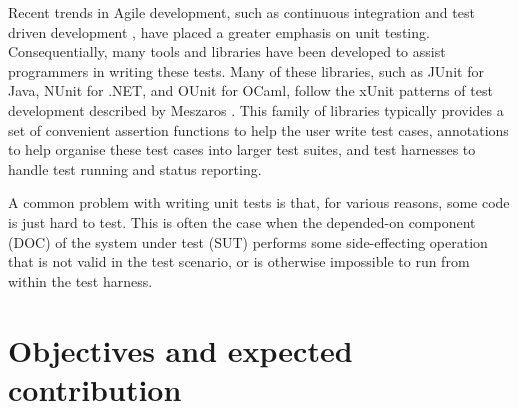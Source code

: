 Recent trends in Agile development, such as continuous integration
\cite{humble:continuous} and test driven development \cite{beck:tdd},
have placed a greater emphasis on unit testing. Consequentially, many
tools and libraries have been developed to assist programmers in
writing these tests. Many of these libraries, such as JUnit
\cite{www:junit} for Java, NUnit \cite{www:nunit} for .NET, and OUnit
\cite{www:ounit} for OCaml, follow the xUnit patterns of test
development described by Meszaros \cite{meszaros:xunit}. This family
of libraries typically provides a set of convenient assertion
functions to help the user write test cases, annotations to help
organise these test cases into larger test suites, and test harnesses
to handle test running and status reporting.

A common problem with writing unit tests is that, for various reasons,
some code is just hard to test. This is often the case when the
depended-on component (DOC) of the system under test (SUT) performs
some side-effecting operation that is not valid in the test scenario,
or is otherwise impossible to run from within the test
harness.

\section{Objectives and expected contribution}
